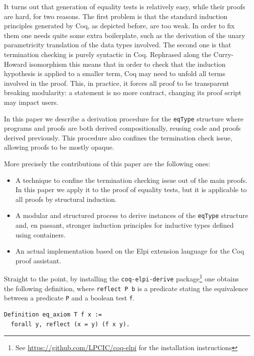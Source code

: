 \documentclass[sigplan,10pt,review]{acmart}\settopmatter{printfolios=true,printccs=false,printacmref=false}
\begin{document}
It turns out that generation of equality tests is relatively easy,
while their proofs are hard, for two reasons. The first problem is that 
the standard induction principles generated by Coq, as depicted
before, are too weak. In order to fix them one needs quite some extra
boilerplate, such as the derivation of the unary parametricity
translation of the data types involved.
The second one is that termination checking
is purely syntactic in Coq. Rephrased along the Curry-Howard
isomorphism this means that in order to check that the induction
hypothesis is applied to a smaller term, Coq may need to unfold all
terms involved in the proof. This, in practice, it forces all proof to
be transparent breaking modularity: a statement is no more contract,
changing its proof script may impact users.

In this paper we describe a derivation procedure for the
\lstinline+eqType+ structure where programs and proofs are both
derived compositionally, reusing code and proofs derived previously.
This procedure also confines the termination check issue,
allowing proofs to be mostly opaque.

More precisely the contributions of this paper are the following ones:
\begin{itemize}
\item A technique to confine the termination checking issue out of the
	main proofs. In this paper we apply it to the proof of equality
	tests, but it is applicable to all proofs by structural
	induction.

\item A modular and structured process to derive instances of the
	\lstinline+eqType+ structure and, en passant, stronger
	induction principles for inductive types defined using
	containers.

\item An actual implementation based on the Elpi extension language
	for the Coq proof assistant.
\end{itemize}

\noindent
Straight to the point, by installing the \lstinline+coq-elpi-derive+
package\footnote{See \url{https://github.com/LPCIC/coq-elpi} for the
installation instructions} 
one obtains the following definition, where \lstinline+reflect P b+
is a predicate stating the equivalence between a predicate
\lstinline+P+ and a boolean test \lstinline+f+.

\begin{minipage}{\textwidth}\begin{lstlisting}
Definition eq_axiom T f x :=
  forall y, reflect (x = y) (f x y).
\end{lstlisting}\end{minipage}
\end{document}
